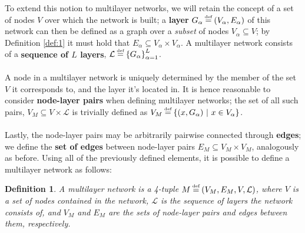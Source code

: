 \documentclass[12pt,a4paper,twoside,openright]{report}
\newtheorem{mydef}{Definition}
\newcommand\myeq{\stackrel{\mathclap{\tiny\mbox{def}}}{=}}
\begin{document}
\noindent To extend this notion to multilayer networks, we will retain the concept of a set of nodes $V$ over which the network is built; a \textbf{layer} $G_\alpha \myeq (V_\alpha, E_\alpha)$ of this network can then be defined as a graph over a \emph{subset} of nodes $V_\alpha \subseteq V$; by Definition \ref{def:1} it must hold that $E_\alpha\subseteq V_\alpha \times V_\alpha$. A multilayer network consists of a \textbf{sequence of $L$ layers}, $\mathcal{L} \myeq \left\{G_\alpha\right\}_{\alpha=1}^L$.\\ \\
A node in a multilayer network is uniquely determined by the member of the set $V$ it corresponds to, and the layer it's located in. It is hence reasonable to consider \textbf{node-layer pairs} when defining multilayer networks; the set of all such pairs, $V_M \subseteq V \times \mathcal{L}$ is trivially defined as $V_M \myeq \left\{(x, G_\alpha)\ |\ x \in V_\alpha \right\}$.\\ \\
Lastly, the node-layer pairs may be arbitrarily pairwise connected through {\bf edges}; we define the {\bf set of edges} between node-layer pairs $E_M \subseteq V_M \times V_M$, analogously as before. Using all of the previously defined elements, it is possible to define a multilayer network as follows:

\begin{mydef}\label{def:2}
\rm A \emph{multilayer network} is a 4-tuple $M \myeq (V_M, E_M, V, \mathcal{L})$, where $V$ is a set of nodes contained in the network, $\mathcal{L}$ is the sequence of layers the network consists of, and $V_M$ and $E_M$ are the sets of node-layer pairs and edges between them, respectively.
\end{mydef}
\end{document}

